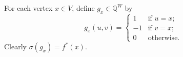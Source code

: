 For each vertex $x \in V$, define $g_x \in \mathbb{Q}^W$ by
$$
g_x(u, v) = \begin{cases}
1 & \text{if } u = x; \\
-1 & \text{if } v = x; \\
0 & \text{otherwise}.
\end{cases}
$$
Clearly $\sigma(g_x) = f^*(x)$.
